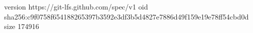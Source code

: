 version https://git-lfs.github.com/spec/v1
oid sha256:c9f0758f654188265397b3592e3df3b5d4827e7886d49f159e19e78ff54cbd0d
size 174916
